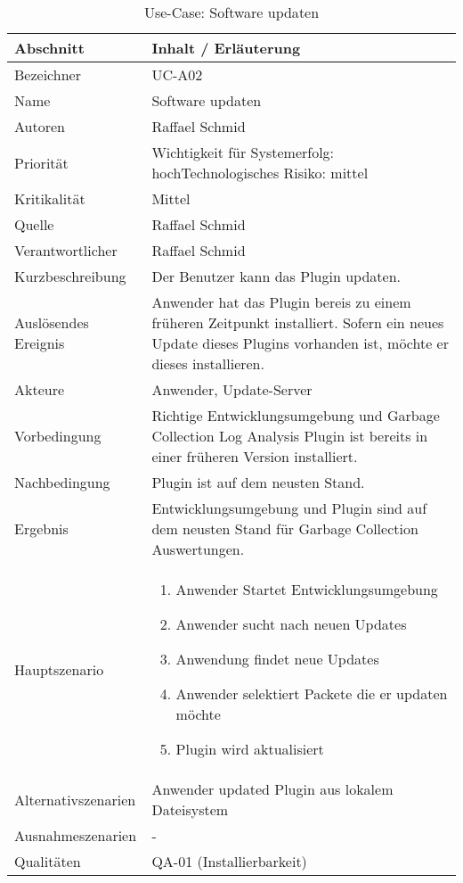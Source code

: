 \begin{longtable}{|p{4cm}|p{10.5cm}|}
\caption{Use-Case: Software updaten}\\\hline
   \textbf{Abschnitt} & \textbf{Inhalt / Erläuterung} \\\hline
   Bezeichner & UC-A02\\\hline
   Name & Software updaten\\\hline
   Autoren & Raffael Schmid\\\hline
   Priorität & Wichtigkeit für Systemerfolg: hoch\newline Technologisches Risiko: mittel\\\hline
   Kritikalität & Mittel\\\hline
   Quelle & Raffael Schmid\\\hline
   Verantwortlicher & Raffael Schmid\\\hline
   Kurzbeschreibung & Der Benutzer kann das Plugin updaten.\\\hline
   Auslösendes Ereignis & Anwender hat das Plugin bereis zu einem früheren Zeitpunkt installiert. Sofern ein neues Update dieses Plugins vorhanden ist, möchte er dieses installieren.\\\hline
   Akteure & Anwender, Update-Server\\\hline
   Vorbedingung & Richtige Entwicklungsumgebung und Garbage Collection Log Analysis Plugin ist bereits in einer früheren Version installiert.\\\hline
   Nachbedingung & Plugin ist auf dem neusten Stand.\\\hline
   Ergebnis & Entwicklungsumgebung und Plugin sind auf dem neusten Stand für Garbage Collection Auswertungen.\\\hline
   Hauptszenario & 
	\begin{enumerate}
		\item Anwender Startet Entwicklungsumgebung
		\item Anwender sucht nach neuen Updates
		\item Anwendung findet neue Updates
		\item Anwender selektiert Packete die er updaten möchte
		\item Plugin wird aktualisiert
	\end{enumerate}
	\\\hline
   Alternativszenarien & Anwender updated Plugin aus lokalem Dateisystem\\\hline
   Ausnahmeszenarien & -\\\hline
   Qualitäten & QA-01 (Installierbarkeit)\\\hline
\end{longtable}

